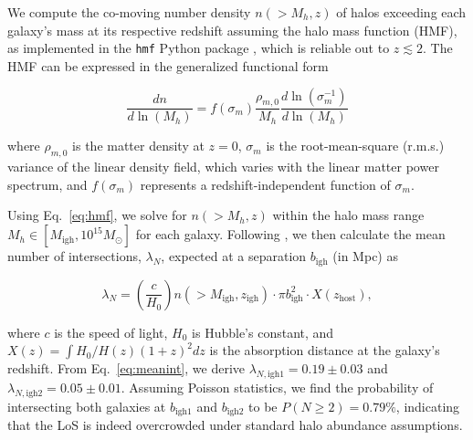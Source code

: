 \documentclass[twocolumn, linenumbers, tra]{aastex631}
\begin{document}
{We compute the co-moving number density $n\left(>M_h, z\right)$ of halos exceeding each galaxy's mass at its respective redshift assuming the \citet{Tinker2008} halo mass function (HMF), as implemented in the \texttt{hmf} Python package \citep{Murray2013}, which is reliable out to $z \lesssim 2$. The HMF can be expressed in the generalized functional form 

\begin{equation}\label{eq:hmf}
  \frac{d n}{d \ln (M_{h})} = f\left(\sigma_m\right) \frac{\rho_{m, 0}}{M_{h}} \frac{d \ln \left(\sigma_m^{-1}\right)}{d \ln (M_{h})}
\end{equation}

\noindent
where $\rho_{m, 0}$ is the matter density at $z=0$, $\sigma_m$ is the root-mean-square (r.m.s.) variance of the linear density field, which varies with the linear matter power spectrum, and $f\left(\sigma_m\right)$ represents a redshift-independent function of $\sigma_m$.

Using Eq.~\ref{eq:hmf}, we solve for $n(>M_h, z)$ within the halo mass range $M_h \in [M_{\mathrm{igh}}, 10^{15} M_{\odot}]$ for each galaxy. Following \citet{Prochaska2019b}, we then calculate the mean number of intersections, $\lambda_{N}$, expected at a separation $b_{\mathrm{igh}}$ (in Mpc) as

\begin{equation} \label{eq:meanint}
\lambda_{N} = \left( \frac{c}{H_0} \right) n(>M_\mathrm{igh}, z_{\mathrm{igh}}) \cdot \pi b_{\mathrm{igh}}^2 \cdot X(z_{\mathrm{host}}),
\end{equation}

\noindent
where $c$ is the speed of light, $H_0$ is Hubble's constant, and $X(z) = \int H_0/H(z)(1+z)^2 d z$ is the absorption distance at the galaxy's redshift. From Eq.~\ref{eq:meanint}, we derive $\lambda_{N,\mathrm{igh1}}=0.19 \pm 0.03$ and $\lambda_{N,\mathrm{igh2}}=0.05 \pm 0.01$. Assuming Poisson statistics, we find the probability of intersecting both galaxies at $b_{\mathrm{igh1}}$ and $b_{\mathrm{igh2}}$ to be $P(N\geq2) = 0.79\%$, indicating that the LoS is indeed overcrowded under standard halo abundance assumptions.}
\end{document}
